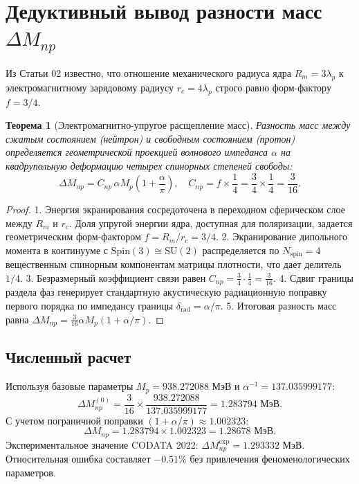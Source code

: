 \documentclass[11pt,a4paper]{article}
\newtheorem{theorem}{Теорема}
\theoremstyle{definition}
\theoremstyle{remark}
\begin{document}
\section{Дедуктивный вывод разности масс $\Delta M_{np}$}
Из Статьи 02 известно, что отношение механического радиуса ядра $R_m = 3\lambda_p$ к электромагнитному зарядовому радиусу $r_c = 4\lambda_p$ строго равно форм-фактору $f = 3/4$.

\begin{theorem}[Электромагнитно-упругое расщепление масс]
\label{thm:mass_split}
Разность масс между сжатым состоянием (нейтрон) и свободным состоянием (протон) определяется геометрической проекцией волнового импеданса $\alpha$ на квадрупольную деформацию четырех спинорных степеней свободы:
\begin{equation}
    \Delta M_{np} = C_{np} \, \alpha M_p \left( 1 + \frac{\alpha}{\pi} \right), \quad C_{np} = f \times \frac{1}{4} = \frac{3}{4} \times \frac{1}{4} = \frac{3}{16}.
\end{equation}
\end{theorem}
\begin{proof}
1. Энергия экранирования сосредоточена в переходном сферическом слое между $R_m$ и $r_c$. Доля упругой энергии ядра, доступная для поляризации, задается геометрическим форм-фактором $f = R_m / r_c = 3/4$.
2. Экранирование дипольного момента в континууме с $\mathrm{Spin}(3) \cong \mathrm{SU}(2)$ распределяется по $N_{\mathrm{spin}} = 4$ вещественным спинорным компонентам матрицы плотности, что дает делитель $1/4$.
3. Безразмерный коэффициент связи равен $C_{np} = \frac{3}{4} \cdot \frac{1}{4} = \frac{3}{16}$.
4. Сдвиг границы раздела фаз генерирует стандартную акустическую радиационную поправку первого порядка по импедансу границы $\delta_{\mathrm{rad}} = \alpha/\pi$.
5. Итоговая разность масс равна $\Delta M_{np} = \frac{3}{16}\alpha M_p (1 + \alpha/\pi)$.
\end{proof}

\subsection{Численный расчет}
Используя базовые параметры $M_p = 938.272088\text{ МэВ}$ и $\alpha^{-1} = 137.035999177$:
\begin{equation}
    \Delta M_{np}^{(0)} = \frac{3}{16} \times \frac{938.272088}{137.035999177} = 1.283794\text{ МэВ}.
\end{equation}
С учетом пограничной поправки $(1 + \alpha/\pi) \approx 1.002323$:
\begin{equation}
    \Delta M_{np} = 1.283794 \times 1.002323 = \mathbf{1.28678\text{ МэВ}}.
\end{equation}
Экспериментальное значение CODATA 2022: $\Delta M_{np}^{\mathrm{exp}} = 1.293332\text{ МэВ}$. 
Относительная ошибка составляет $-0.51\%$ без привлечения феноменологических параметров.
\end{document}
